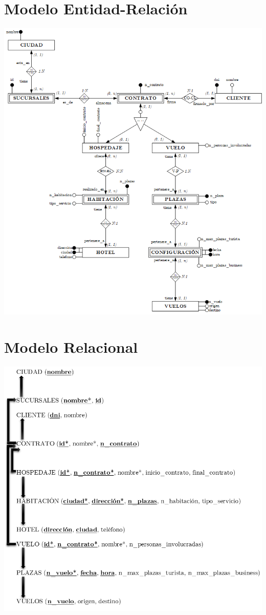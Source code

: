 \documentclass[a4paper,10pt]{article}
\begin{document}
\section{Modelo Entidad-Relación}
\begin{centering}
\includegraphics[scale=.63, angle=0]{img/er.png}\\
\end{centering}

\pagebreak
\section{Modelo Relacional}
\begin{centering}
\includegraphics[scale=.63, angle=0]{img/r.png}\\
\end{centering}
\end{document}
